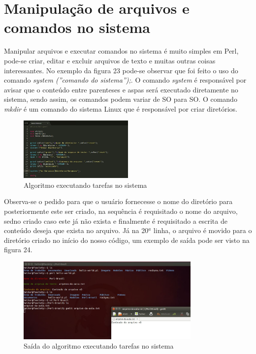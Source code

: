\chapter{Manipula\c{c}\~ao de arquivos e comandos no sistema}
Manipular arquivos e executar comandos no sistema \'e muito simples em Perl, pode-se criar, editar e excluir arquivos de texto e muitas outras coisas 
interessantes. No exemplo da figura 23 pode-se observar que foi feito o uso do comando \textit{system (''comando do sistema'');}. O comando \textit{system} 
\'e respons\'avel por avisar que o conte\'udo entre parenteses e aspas ser\'a executado diretamente no sistema, sendo assim, os comandos podem variar de SO 
para SO. O comando \textit{mkdir} \'e um comando do sistema Linux que \'e respons\'avel por criar diret\'orios.

\begin{figure}[!htb]
	\centering
	\includegraphics[width=0.5\textwidth]{../5_figuras/image23}
	\caption{Algoritmo executando tarefas no sistema}
\end{figure}

\clearpage

Observa-se o pedido para que o usu\'ario fornecesse o nome do diret\'orio para posteriormente este ser criado, na sequ\^encia \'e requisitado o nome do 
arquivo, sedno criado caso este j\'a n\~ao exista e finalmente \'e requisitado a escrita de conte\'udo deseja que exista no arquivo. J\'a na 20$^a$ linha, 
o arquivo \'e movido para o diret\'orio criado no in\'icio do nosso c\'odigo, um exemplo de sa\'ida pode ser visto na figura 24.

\begin{figure}[!htb]
	\centering
	\includegraphics[width=0.8\textwidth]{../5_figuras/image24}
	\caption{Sa\'ida do algoritmo executando tarefas no sistema}
\end{figure}

